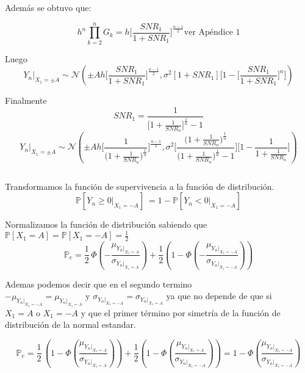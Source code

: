 \documentclass[11pt]{article}
\makeatletter
\newcommand{\boxspacing}{\kern\kvtcb@left@rule\kern\kvtcb@boxsep}
\newcommand{\prompt}[4]{
        \ttfamily\llap{{\color{#2}[#3]:\hspace{3pt}#4}}\vspace{-\baselineskip}
    }
\makeatother
\begin{document}
Además se obtuvo que:

\[
h^{n} \prod_{k=2}^{n} G_{k} = h \bigg[\frac{SNR_1}{1+SNR_1}\bigg]^{\frac{n-1}{2}} \text{ver Apéndice 1}
\]

Luego
\[{Y_{n}|}_{X_1 = \pm A} \sim \mathcal{N}(\pm A h \bigg[\frac{SNR_1}{1+SNR_1}\bigg]^{\frac{n-1}{2}},\sigma^2 [1+SNR_1] \Bigg[1-\bigg[\frac{SNR_1}{1+SNR_1}\bigg]^n\Bigg])\]

Finalmente
\[SNR_1 = \frac{1}{\big[1+\frac{1}{SNR_n}\big]^{\frac{1}{n}}-1}\]
\[{Y_{n}|}_{X_1 = \pm A} \sim \mathcal{N}(\pm A h \bigg[\frac{1}{\bigg(1+\frac{1}{SNR_n}\bigg)^{\frac{1}{n}}}\bigg]^{\frac{n-1}{2}},\sigma^2 \Bigg[\frac{\big(1+\frac{1}{SNR_n}\big)^{\frac{1}{n}}}{\big(1+\frac{1}{SNR_n}\big)^{\frac{1}{n}}-1}\Bigg] \Bigg[1-\frac{1}{1+\frac{1}{SNR_n}}\Bigg])\]

    \begin{tcolorbox}[breakable, size=fbox, boxrule=1pt, pad at break*=1mm,colback=cellbackground, colframe=cellborder]
\prompt{In}{incolor}{ }{\boxspacing}
\begin{Verbatim}[commandchars=\\\{\}]

\end{Verbatim}
\end{tcolorbox}

    Transformamos la función de supervivencia a la función de distribución.
\[
\mathbb{P}\left[Y_{n} \geq 0 |_{X_{1} = -A}\right]\ = 1-\mathbb{P}\left[Y_{n} < 0 |_{X_{1} = -A}\right]
\]

Normalizamos la función de distribución sabiendo que
\(\mathbb{P}\left[X_{1} = A\right] = \mathbb{P}\left[X_{1} = -A\right] = \frac{1}{2}\)
\[
   \mathbb{P}_{e} = \frac{1}{2}\,\Phi\left(-\frac{\mu_{{Y_{n}|}_{X_1 = A}}}{\sigma_{{{Y_{n}|}_{X_1 = A}}}}\right) + \frac{1}{2}\left(1-\Phi\left(-\frac{\mu_{{Y_{n}|}_{X_1 = -A}}}{\sigma_{{Y_{n}|}_{X_1 = -A}}}\right)\right)
\]

Ademas podemos decir que en el segundo termino
\(-\mu_{{Y_{n}|}_{X_1 = -A}}=\mu_{{Y_{n}|}_{X_1 = A}} \text{ y } \sigma_{{Y_{n}|}_{X_1 = -A}}=\sigma_{{Y_{n}|}_{X_1 = A}}\)
ya que no depende de que si \(X_{1}=A \text{ o } X_{1}=-A\) y que el
primer término por simetría de la función de distribución de la normal
estandar.

\[
    \mathbb{P}_{e} = \frac{1}{2}\,\left(1-\Phi\left(\frac{\mu_{{Y_{n}|}_{X_1 = A}}}{\sigma_{{{Y_{n}|}_{X_1 = A}}}}\right)\right) + \frac{1}{2}\left(1-\Phi\left(\frac{\mu_{{Y_{n}|}_{X_1 = A}}}{\sigma_{{Y_{n}|}_{X_1 = -A}}}\right)\right)
    =1-\Phi\left(\frac{\mu_{{Y_{n}|}_{X_1 = -A}}}{\sigma_{{{Y_{n}|}_{X_1 = -A}}}}\right)
\]
\end{document}
